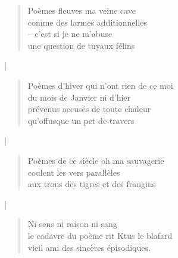   \begin{verse}
    Poèmes fleuves ma veine cave\\
    comme des larmes additionnelles\\
    -- c’est si je ne m’abuse\\
    une question de tuyaux félins
  \end{verse}
  \begin{center}
    |
  \end{center}
  \begin{verse}
    Poèmes d’hiver qui n’ont rien de ce moi\\
    du mois de Janvier ni d’hier\\
    prévenus accusés de toute chaleur\\
    qu’offusque un pet de travers
  \end{verse}
  \begin{center}
    |
  \end{center}
  \begin{verse}
    Poèmes de ce siècle oh ma sauvagerie\\
    coulent les vers parallèles\\
    aux trous des tigres et des frangins
  \end{verse}
  \begin{center}
    |
  \end{center}
  \begin{verse}
    Ni sens ni raison ni sang\\
    le cadavre du poème rit Ktus le blafard\\
    vieil ami des sincères épisodiques.
  \end{verse}

